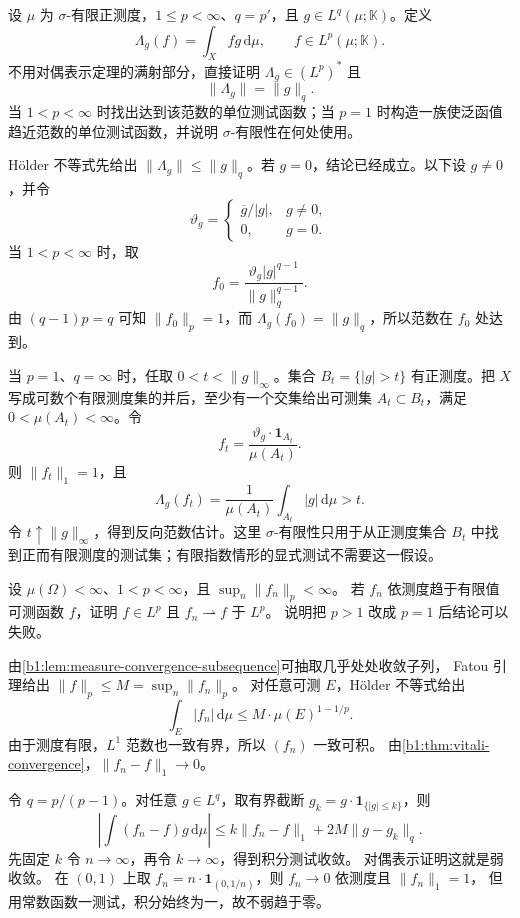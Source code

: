 \begin{exercise}[对偶范数]\label{b1:ex:10-dual-norm-test}
设 \(\mu\) 为 \(\sigma\)-有限正测度，\(1\leq p<\infty\)、\(q=p'\)，且 \(g\in L^q(\mu;\mathbb K)\)。定义
\[
 \Lambda_g(f)=\int_Xfg\,\mathrm d\mu,
 \qquad f\in L^p(\mu;\mathbb K).
\]
不用对偶表示定理的满射部分，直接证明 \(\Lambda_g\in(L^p)^*\) 且
\[
 \|\Lambda_g\|=\|g\|_q.
\]
当 \(1<p<\infty\) 时找出达到该范数的单位测试函数；当 \(p=1\) 时构造一族使泛函值趋近范数的单位测试函数，并说明 \(\sigma\)-有限性在何处使用。
\end{exercise}
\begin{solution}
Hölder 不等式先给出 \(\|\Lambda_g\|\leq\|g\|_q\)。若 \(g=0\)，结论已经成立。以下设 \(g\ne0\)，并令
\[
 \vartheta_g=
 \begin{cases}
  \overline g/|g|,&g\ne0,\\
  0,&g=0.
 \end{cases}
\]
当 \(1<p<\infty\) 时，取
\[
 f_0=\frac{\vartheta_g|g|^{q-1}}{\|g\|_q^{q-1}}.
\]
由 \((q-1)p=q\) 可知 \(\|f_0\|_p=1\)，而
\(\Lambda_g(f_0)=\|g\|_q\)，所以范数在 \(f_0\) 处达到。

当 \(p=1\)、\(q=\infty\) 时，任取 \(0<t<\|g\|_\infty\)。集合 \(B_t=\{|g|>t\}\) 有正测度。把 \(X\) 写成可数个有限测度集的并后，至少有一个交集给出可测集 \(A_t\subset B_t\)，满足
\(0<\mu(A_t)<\infty\)。令
\[
 f_t=\frac{\vartheta_g\cdot\mathbf1_{A_t}}{\mu(A_t)}.
\]
则 \(\|f_t\|_1=1\)，且
\[
 \Lambda_g(f_t)=\frac1{\mu(A_t)}\int_{A_t}|g|\,\mathrm d\mu>t.
\]
令 \(t\uparrow\|g\|_\infty\)，得到反向范数估计。这里 \(\sigma\)-有限性只用于从正测度集合 \(B_t\) 中找到正而有限测度的测试集；有限指数情形的显式测试不需要这一假设。
\end{solution}

\begin{exercise}\label{b1:ex:10-measure-to-weak}
设 \(\mu(\Omega)<\infty\)、\(1<p<\infty\)，且 \(\sup_n\|f_n\|_p<\infty\)。
若 \(f_n\) 依测度趋于有限值可测函数 \(f\)，证明 \(f\in L^p\) 且 \(f_n\rightharpoonup f\) 于 \(L^p\)。
说明把 \(p>1\) 改成 \(p=1\) 后结论可以失败。
\end{exercise}
\begin{solution}
由\cref{b1:lem:measure-convergence-subsequence}可抽取几乎处处收敛子列，
Fatou 引理给出 \(\|f\|_p\leq M=\sup_n\|f_n\|_p\)。
对任意可测 \(E\)，Hölder 不等式给出
\[
 \int_E|f_n|\,\mathrm{d}\mu\leq M\cdot\mu(E)^{1-1/p}.
\]
由于测度有限，\(L^1\) 范数也一致有界，所以 \((f_n)\) 一致可积。
由\cref{b1:thm:vitali-convergence}，\(\|f_n-f\|_1\to0\)。

令 \(q=p/(p-1)\)。对任意 \(g\in L^q\)，取有界截断 \(g_k=g\cdot\mathbf1_{\{|g|\leq k\}}\)，则
\[
 \left|\int(f_n-f)g\,\mathrm{d}\mu\right|
 \leq k\|f_n-f\|_1+2M\|g-g_k\|_q.
\]
先固定 \(k\) 令 \(n\to\infty\)，再令 \(k\to\infty\)，得到积分测试收敛。
对偶表示证明这就是弱收敛。
在 \((0,1)\) 上取 \(f_n=n\cdot\mathbf1_{(0,1/n)}\)，则 \(f_n\to0\) 依测度且 \(\|f_n\|_1=1\)，
但用常数函数一测试，积分始终为一，故不弱趋于零。
\end{solution}

